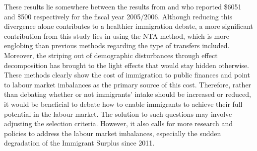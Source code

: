 \vspace{0.7em}\par
These results lie somewhere between the results from \citet{Grubel:2012wo} and \citet{Javdani:2013gu} who reported \$\num{6051} and \$500 respectively for the fiscal year 2005/2006.
Although reducing this divergence alone contributes to a healthier immigration debate, a more significant contribution from this study lies in using the NTA method, which is more englobing than previous methods regarding the type of transfers included.
Moreover, the striping out of demographic disturbances through effect decomposition has brought to the light effects that would stay hidden otherwise.
These methods clearly show the cost of immigration to public finances and point to labour market imbalances as the primary source of this cost.
Therefore, rather than debating whether or not immigrants' intake should be increased or reduced, it would be beneficial to debate how to enable immigrants to achieve their full potential in the labour market.
The solution to such questions may involve adjusting the selection criteria.
However, it also calls for more research and policies to address the labour market imbalances, especially the sudden degradation of the Immigrant Surplus since 2011.